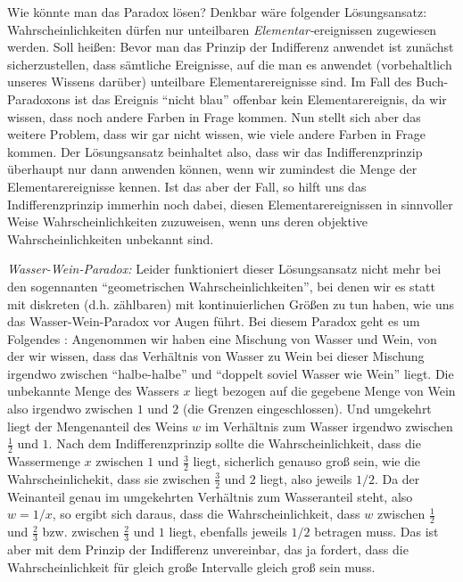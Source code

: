 Wie könnte man das Paradox lösen? Denkbar wäre folgender Lösungsansatz:
Wahrscheinlichkeiten dürfen nur unteilbaren {\em Elementar-}ereignissen
zugewiesen werden. Soll heißen: Bevor man das Prinzip der Indifferenz anwendet
ist zunächst sicherzustellen, dass sämtliche Ereignisse, auf die man es anwendet
(vorbehaltlich unseres Wissens darüber) unteilbare Elementarereignisse sind. Im
Fall des Buch-Paradoxons ist das Ereignis "`nicht blau"' offenbar kein
Elementarereignis, da wir wissen, dass noch andere Farben in Frage kommen. Nun
stellt sich aber das weitere Problem, dass wir gar nicht wissen, wie viele andere
Farben in Frage kommen. Der Lösungsansatz beinhaltet also, dass wir das
Indifferenzprinzip überhaupt nur dann anwenden können, wenn wir zumindest die
Menge der Elementarereignisse kennen. Ist das aber der Fall, so hilft uns das
Indifferenzprinzip immerhin noch dabei, diesen Elementarereignissen in sinnvoller
Weise Wahrscheinlichkeiten zuzuweisen, wenn uns deren objektive
Wahrscheinlichkeiten unbekannt sind.

{\em Wasser-Wein-Paradox:}
\label{WasserWeinParadox} Leider funktioniert dieser Lösungsansatz nicht mehr bei
den sogennanten "`geometrischen Wahrscheinlichkeiten"', bei denen wir es statt
mit diskreten (d.h. zählbaren) mit kontinuierlichen Größen zu tun haben, wie uns
das Wasser-Wein-Paradox vor Augen führt. Bei diesem Paradox geht es um Folgendes
\cite[p. 84]{howson:2000}: Angenommen wir haben eine Mischung von Wasser und
Wein, von der wir wissen, dass das Verhältnis von Wasser zu Wein bei dieser
Mischung irgendwo zwischen "`halbe-halbe"' und "`doppelt soviel Wasser wie Wein"'
liegt. Die unbekannte Menge des Wassers $x$ liegt bezogen auf die gegebene Menge
von Wein also irgendwo zwischen $1$ und $2$ (die Grenzen eingeschlossen). Und
umgekehrt liegt der Mengenanteil des Weins $w$ im Verhältnis zum Wasser irgendwo
zwischen $\frac{1}{2}$ und $1$. Nach dem Indifferenzprinzip sollte die
Wahrscheinlichkeit, dass die Wassermenge $x$ zwischen $1$ und $\frac{3}{2}$
liegt, sicherlich genauso groß sein, wie die Wahrscheinlichekit, dass sie
zwischen $\frac{3}{2}$ und $2$ liegt, also jeweils $1/2$. Da der Weinanteil genau
im umgekehrten Verhältnis zum Wasseranteil steht, also $w = 1/x$, so ergibt sich
daraus, dass die Wahrscheinlichkeit, dass $w$ zwischen $\frac{1}{2}$ und
$\frac{2}{3}$ bzw. zwischen $\frac{2}{3}$ und $1$ liegt, ebenfalls jeweils $1/2$
betragen muss. Das ist aber mit dem Prinzip der Indifferenz unvereinbar, das ja
fordert, dass die Wahrscheinlichkeit für gleich große Intervalle gleich groß sein
muss.

